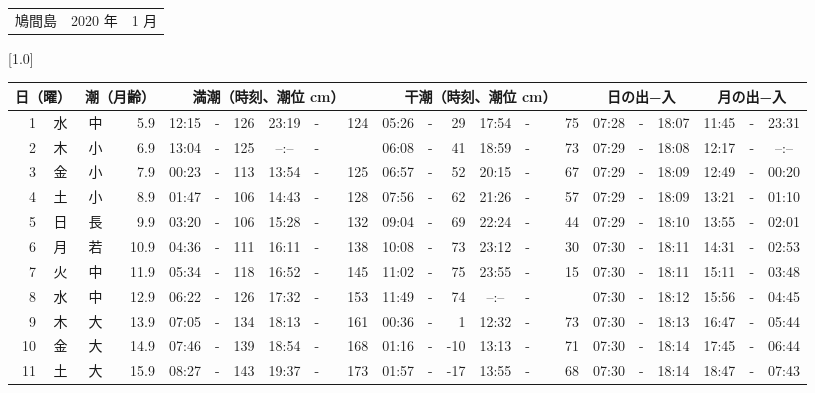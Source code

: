 \documentclass[12pt,a4j]{jsarticle}
\begin{document}
 \begin{table}[htbp]
 \begin{center}
 \begin{tabular}{lcc}
 \LARGE{鳩間島}  & \large{2020 年} & \large{ 1 月} \\
 \end{tabular}
 \end{center}
 \begin{center}
    \scalebox{0.7}[1.0]{
    \begin{tabular}{|rc|cr|ccrccr|ccrccr|ccc|ccc|}
    \hline
    \multicolumn{2}{|c|}{日（曜）} & \multicolumn{2}{c|}{潮（月齢）} & \multicolumn{6}{c|}{満潮（時刻、潮位 cm）} & \multicolumn{6}{c|}{干潮（時刻、潮位 cm）} & \multicolumn{3}{c|}{日の出−入} &  \multicolumn{3}{c|}{月の出−入}\\
 \hline
 1 & 水 & 中 &  5.9 &  12:15 &-& 126 &  23:19 &-& 124 &  05:26 &-&  29 &  17:54 &-&  75 & 07:28 & -& 18:07 & 11:45 & -& 23:31 \\
 2 & 木 & 小 &  6.9 &  13:04 &-& 125 &  --:-- &-&~~~~~ &  06:08 &-&  41 &  18:59 &-&  73 & 07:29 & -& 18:08 & 12:17 & -& --:-- \\
 3 & 金 & 小 &  7.9 &  00:23 &-& 113 &  13:54 &-& 125 &  06:57 &-&  52 &  20:15 &-&  67 & 07:29 & -& 18:09 & 12:49 & -& 00:20 \\
 4 & 土 & 小 &  8.9 &  01:47 &-& 106 &  14:43 &-& 128 &  07:56 &-&  62 &  21:26 &-&  57 & 07:29 & -& 18:09 & 13:21 & -& 01:10 \\
 5 & 日 & 長 &  9.9 &  03:20 &-& 106 &  15:28 &-& 132 &  09:04 &-&  69 &  22:24 &-&  44 & 07:29 & -& 18:10 & 13:55 & -& 02:01 \\
 6 & 月 & 若 & 10.9 &  04:36 &-& 111 &  16:11 &-& 138 &  10:08 &-&  73 &  23:12 &-&  30 & 07:30 & -& 18:11 & 14:31 & -& 02:53 \\
 7 & 火 & 中 & 11.9 &  05:34 &-& 118 &  16:52 &-& 145 &  11:02 &-&  75 &  23:55 &-&  15 & 07:30 & -& 18:11 & 15:11 & -& 03:48 \\
 8 & 水 & 中 & 12.9 &  06:22 &-& 126 &  17:32 &-& 153 &  11:49 &-&  74 &  --:-- &-&~~~~~ & 07:30 & -& 18:12 & 15:56 & -& 04:45 \\
 9 & 木 & 大 & 13.9 &  07:05 &-& 134 &  18:13 &-& 161 &  00:36 &-&   1 &  12:32 &-&  73 & 07:30 & -& 18:13 & 16:47 & -& 05:44 \\
10 & 金 & 大 & 14.9 &  07:46 &-& 139 &  18:54 &-& 168 &  01:16 &-& -10 &  13:13 &-&  71 & 07:30 & -& 18:14 & 17:45 & -& 06:44 \\
11 & 土 & 大 & 15.9 &  08:27 &-& 143 &  19:37 &-& 173 &  01:57 &-& -17 &  13:55 &-&  68 & 07:30 & -& 18:14 & 18:47 & -& 07:43 \\

\end{tabular}}
\end{center}
\end{table}
\end{document}
